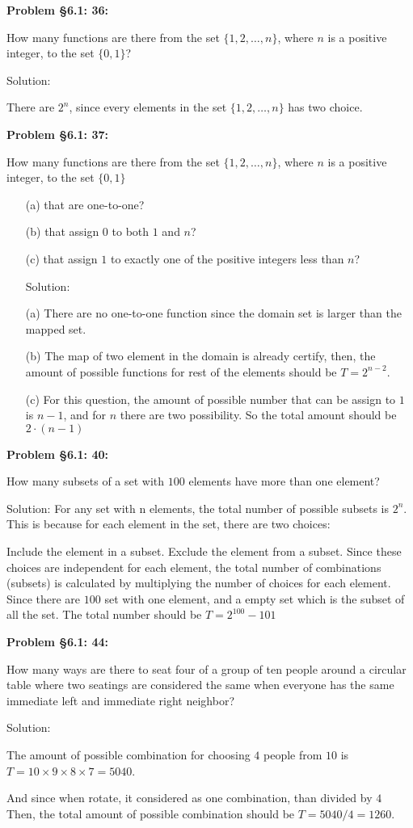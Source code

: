 \documentclass{article}
\newenvironment{problem}[1]
{\begin{mdframed}[default]
\textbf{Problem #1:}
}
{\end{mdframed}
}
\begin{document}
\begin{problem}{\S 6.1: 36}
How many functions are there from the set $\{1, 2, \dots, n \}$, where $n$ is a
positive integer, to the set $\{ 0, 1 \}$?

Solution:

There are $2^n$, since every elements in the set $\{1,2,\dots ,n\}$ has two choice.

\end{problem}
\begin{problem}{\S 6.1: 37}
How many functions are there from the set $\{ 1, 2, \dots, n \}$, where $n$ is a
positive integer, to the set $\{ 0, 1 \}$
\begin{enumerate}
\item[(a)] that are one-to-one?
\item[(b)] that assign $0$ to both $1$ and $n$?
\item[(c)] that assign $1$ to exactly one of the positive integers less than
$n$?

Solution:

(a) There are no one-to-one function since the domain set is larger than the mapped set.

(b) The map of two element in the domain is already certify, then, the amount of possible functions for rest of the elements should be $T=2^{n-2}$.

(c) For this question, the amount of possible number that can be assign to $1$ is $n-1$, and for $n$ there are two possibility. So the total amount should be $2\cdot(n-1)$
\end{enumerate}
\end{problem}
\begin{problem}{\S 6.1: 40}
How many subsets of a set with $100$ elements have more than one element?

Solution:
For any set with n elements, the total number of possible subsets is 
$2^n$. This is because for each element in the set, there are two choices:

Include the element in a subset.
Exclude the element from a subset.
Since these choices are independent for each element, the total number of combinations (subsets) is calculated by multiplying the number of choices for each element.
Since there are $100$ set with one element, and a empty set which is the subset of all the set. The total number should be $T=2^{100}-101$
\end{problem}
\begin{problem}{\S 6.1: 44}
How many ways are there to seat four of a group of ten people around a circular
table where two seatings are considered the same when everyone has the same
immediate left and immediate right neighbor?

Solution:

The amount of possible combination for choosing $4$ people from $10$ is $T=10\times9\times8\times7=5040$.

And since when rotate, it considered as one combination, than divided by $4$
Then, the total amount of possible combination should be $T=5040/4=1260$.
\end{problem}
\end{document}
